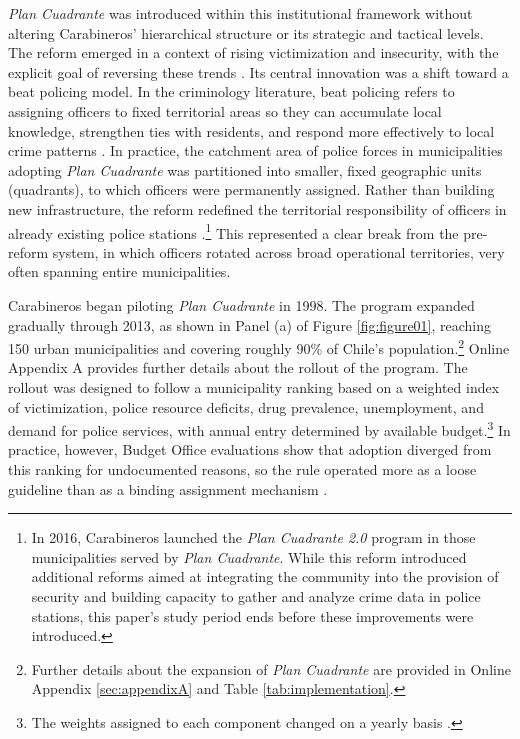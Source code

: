 \emph{Plan Cuadrante} was introduced within this institutional framework without altering Carabineros' hierarchical structure or its strategic and tactical levels. The reform emerged in a context of rising victimization and insecurity, with the explicit goal of reversing these trends \citep{PCSP2014}. Its central innovation was a shift toward a beat policing model. In the criminology literature, beat policing refers to assigning officers to fixed territorial areas so they can accumulate local knowledge, strengthen ties with residents, and respond more effectively to local crime patterns \citep{cordner1995community,skogan1997comminuty}. In practice, the catchment area of police forces in municipalities adopting \emph{Plan Cuadrante} was partitioned into smaller, fixed geographic units (quadrants), to which officers were permanently assigned. Rather than building new infrastructure, the reform redefined the territorial responsibility of officers in already existing police stations \citep{DIPRES2007_largo}.\footnote{In 2016, Carabineros launched the \emph{Plan Cuadrante 2.0} program in those municipalities served by \emph{Plan Cuadrante}. While this reform introduced additional reforms aimed at integrating the community into the provision of security and building capacity to gather and analyze crime data in police stations, this paper's study period ends before these improvements were introduced.} This represented a clear break from the pre-reform system, in which officers rotated across broad operational territories, very often spanning entire municipalities.

Carabineros began piloting \emph{Plan Cuadrante} in 1998. The program expanded gradually through 2013, as shown in Panel (a) of Figure \ref{fig:figure01}, reaching 150 urban municipalities and covering roughly 90\% of Chile's population.\footnote{Further details about the expansion of \emph{Plan Cuadrante} are provided in Online Appendix \ref{sec:appendixA} and Table \ref{tab:implementation}.} Online Appendix A provides further details about the rollout of the program. The rollout was designed to follow a municipality ranking based on a weighted index of victimization, police resource deficits, drug prevalence, unemployment, and demand for police services, with annual entry determined by available budget.\footnote{The weights assigned to each component changed on a yearly basis \citep{DIPRES2007_largo,DIPRES2014}.} In practice, however, Budget Office evaluations show that adoption diverged from this ranking for undocumented reasons, so the rule operated more as a loose guideline than as a binding assignment mechanism \citep{DIPRES2014}.

